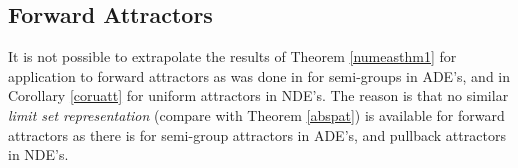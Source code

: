 %

\subsection{Forward Attractors}

It is not possible to extrapolate the results of Theorem \ref{numeasthm1} for
application to forward attractors as was done in \cite{StHu96} for
semi-groups in ADE's, and in Corollary \ref{coruatt} for uniform
attractors in NDE's. The reason is that no
similar \textit{limit set representation} (compare with Theorem
\ref{abspat}) is available for forward attractors as there is for
semi-group attractors in ADE's, and pullback attractors in NDE's.


